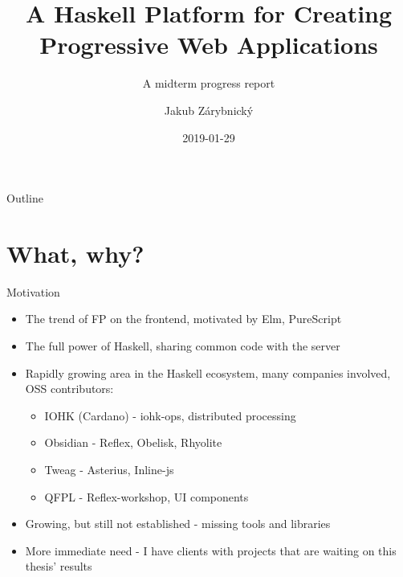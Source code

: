 \documentclass[presentation]{beamer}
\author{Jakub Zárybnický}
\date{2019-01-29}
\title{A Haskell Platform for Creating Progressive Web Applications}
\subtitle{A midterm progress report}
\begin{document}
\maketitle
\begin{frame}{Outline}
\tableofcontents
\end{frame}


\section{What, why?}
\label{sec:org27da95f}
\begin{frame}[label={sec:orgd6ecc70}]{Motivation}
\begin{itemize}
\item The trend of FP on the frontend, motivated by Elm, PureScript
\item The full power of Haskell, sharing common code with the server
\item Rapidly growing area in the Haskell ecosystem, many companies involved, OSS
contributors:
\begin{itemize}
\item IOHK (Cardano) - iohk-ops, distributed processing
\item Obsidian - Reflex, Obelisk, Rhyolite
\item Tweag - Asterius, Inline-js
\item QFPL - Reflex-workshop, UI components
\end{itemize}
\item Growing, but still not established - missing tools and libraries
\item More immediate need - I have clients with projects that are waiting on this
thesis' results
\end{itemize}
\end{frame}
\end{document}
